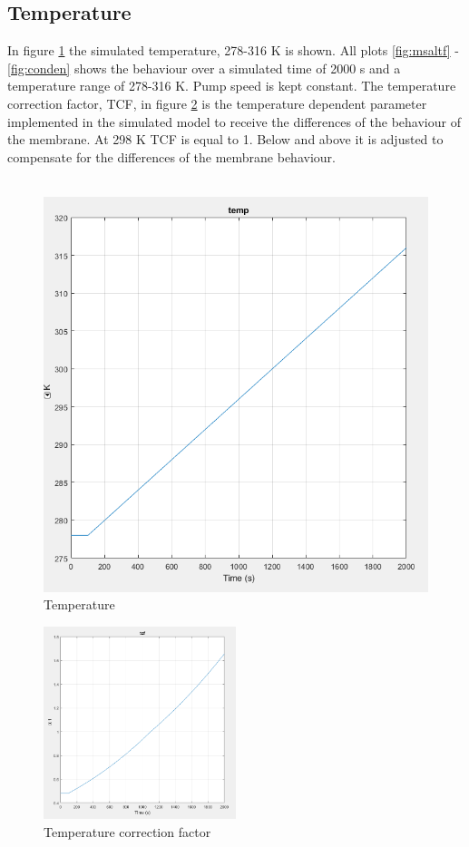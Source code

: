 \subsection{Temperature}
In figure \ref{fig:temp} the simulated temperature, 278-316 K is shown. All plots \ref{fig:msaltf} - \ref{fig:conden} shows the behaviour over a simulated time of 2000 s and a temperature range of 278-316 K. Pump speed is kept constant. The temperature correction factor, TCF, in figure \ref{fig:tcf} is the temperature dependent parameter implemented in the simulated model to receive the differences of the behaviour of the membrane. At 298 K TCF is equal to 1. Below and above it is adjusted to compensate for the differences of the membrane behaviour. \\
\\
\begin{figure}[h]
  \centering
  \includegraphics[width=0.5\linewidth]{temp.PNG}
  \caption{Temperature}
  \label{fig:temp}
\end{figure}
\begin{figure}[h]
\centering
    \centering
    \includegraphics[width=0.5\textwidth]{tcf.PNG}
    \caption{Temperature correction factor}
    \label{fig:tcf}
\end{figure}

